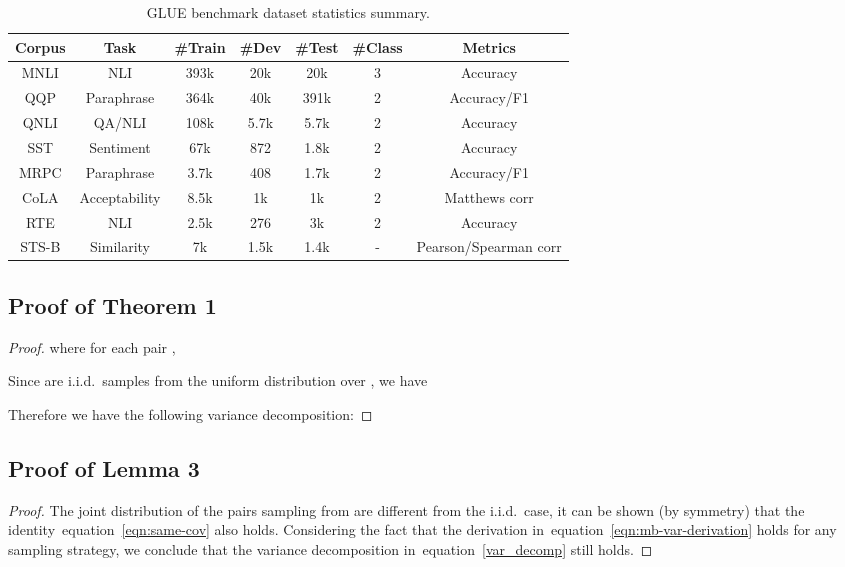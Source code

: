 \documentclass{article} \usepackage{iclr2021_conference,times}
\def\eqref#1{equation~\ref{#1}}
\theoremstyle{plain}
\begin{document}
\begin{table}[h]
    \centering
    	\setlength{\tabcolsep}{6pt}
	\def\arraystretch{1.05}
    \begin{tabular}{c||c|c|c|c|c|c} \hline
        \toprule[1.2pt]
        \textbf{Corpus} & \textbf{Task} & \textbf{\#Train} & \textbf{\#Dev} & \textbf{\#Test} & \textbf{\#Class} & \textbf{Metrics} \\ \hline
        MNLI & NLI  & 393k & 20k & 20k & 3 & Accuracy \\ \hline
        QQP & Paraphrase  & 364k & 40k & 391k & 2 & Accuracy/F1 \\ \hline
        QNLI & QA/NLI  & 108k & 5.7k & 5.7k & 2 & Accuracy \\ \hline
        SST & Sentiment & 67k & 872 & 1.8k & 2 & Accuracy \\ \hline
        MRPC & Paraphrase & 3.7k & 408 & 1.7k & 2 & Accuracy/F1 \\ \hline
        CoLA & Acceptability & 8.5k & 1k & 1k & 2 & Matthews corr \\ \hline
        RTE & NLI & 2.5k & 276 & 3k & 2 & Accuracy \\ \hline
        STS-B & Similarity & 7k & 1.5k & 1.4k & - & Pearson/Spearman corr \\ 
        \bottomrule[1.2pt]
    \end{tabular}
    \caption{GLUE benchmark dataset statistics summary.}
    \label{tab:data}
\end{table}

\subsection{Proof of Theorem 1}
\label{appendix:1}
\begin{proof}

	
	

where for each pair , 


Since  are i.i.d.\ samples from the uniform distribution over , we have 


Therefore we have the following variance decomposition:

\end{proof}

\subsection{Proof of Lemma 3}
\label{sec:lemm3}
\begin{proof}
The joint distribution of the pairs  sampling from  are different from the i.i.d.\ case, it can be shown (by symmetry) that the identity~\eqref{eqn:same-cov} also holds.
Considering the fact that the derivation in~\eqref{eqn:mb-var-derivation} holds for any sampling strategy, we conclude that the variance decomposition in~\eqref{var_decomp} still holds. 
\end{proof}
\end{document}
